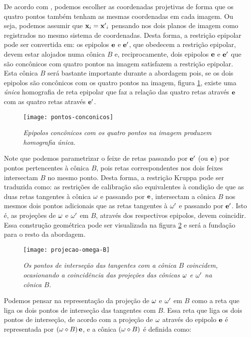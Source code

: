 De acordo com \cite{kneebone}, podemos escolher as coordenadas projetivas de forma que os quatro pontos também tenham as mesmas coordenadas em cada imagem. Ou seja, podemos assumir que ${\bf x}_i = {\bf x'}_i$ pensando nos dois planos de imagem como registrados no mesmo sistema de coordenadas. Desta forma, a restrição epipolar pode ser convertida em: os epipolos ${\bf e}$ e ${\bf e'}$, que obedecem a restrição epipolar, devem estar alojados numa cônica $B$ e, reciprocamente, dois epipolos ${\bf e}$ e ${\bf e'}$ que são concônicos com quatro pontos na imagem satisfazem a restrição epipolar. Esta cônica $B$ será bastante importante durante a abordagem pois, se os dois epipolos são concônicos com os quatro pontos na imagem, figura \ref{pontos-conconicos}, existe uma \textit{única} homografia de reta epipolar que faz a relação das quatro retas através ${\bf e}$ com as quatro retas através ${\bf e'}$. 

\begin{figure}[!htb]
\centering
\texttt{[image: pontos-conconicos]}
\caption{\textit{Epipolos concônicos com os quatro pontos na imagem produzem homografia única.}}
\label{pontos-conconicos}
\end{figure}

Note que podemos parametrizar o feixe de retas passando por ${\bf e'}$ (ou ${\bf e}$) por pontos pertencentes à cônica $B$, pois retas correspondentes nos dois feixes intersectam $B$ no mesmo ponto. Desta forma, a restrição Kruppa pode ser traduzida como: as restrições de calibração são equivalentes à condição de que as duas retas tangentes à cônica ${\bf \omega}$ e passando por ${\bf e}$, intersectam a cônica $B$ nos mesmos dois pontos adicionais que as retas tangentes à ${\bf \omega'}$ e passando por ${\bf e'}$. Isto é, as projeções de ${\bf \omega}$ e ${\bf \omega'}$ em $B$, através dos respectivos epipolos, devem coincidir. Essa construção geométrica pode ser visualizada na figura \ref{omega-B} e será a fundação para o resto da abordagem. 

\begin{figure}[!htb]
\centering
\texttt{[image: projecao-omega-B]}
\caption{\textit{Os pontos de interseção das tangentes com a cônica $B$ coincidem, ocasionando a coincidência das projeções das cônicas ${\bf \omega}$ e ${\bf \omega'}$ na cônica $B$.}}
\label{omega-B}
\end{figure}

Podemos pensar na representação da projeção de  ${\bf \omega}$ e ${\bf \omega'}$ em $B$ como a reta que liga os dois pontos de interseção das tangentes com $B$. Essa reta que liga os dois pontos de interseção, de acordo com a projeção de ${\bf \omega}$ através do epipolo ${\bf e}$ é representada por $({\bf \omega}\diamond B)\,{\bf e}$, e a cônica $({\bf \omega}\diamond B)$ é definida como:

